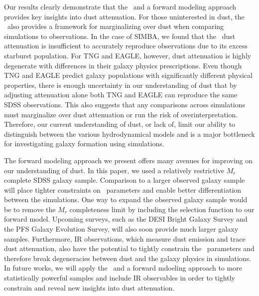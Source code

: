 Our results clearly demonstrate that the \eda~and a forward modeling approach
provides key insights into dust attenuation. For those uninterested in dust,
the \eda~also provides a framework for marginalizing over dust when comparing
simulations to observations. In the case of SIMBA, we found that the \eda~dust
attenuation is insufficient to accurately reproduce observations due to its 
excess starburst population. For TNG and EAGLE, however, dust attenuation is highly
degenerate with differences in their galaxy physics
prescriptions. Even though TNG and EAGLE predict galaxy populations with
significantly different physical properties, there is enough uncertainty in our
understanding of dust that by adjusting attenuation alone both TNG and EAGLE
can reproduce the same SDSS observations. This also suggests that any
comparisons across simulations must marginalize over dust attenuation or run 
the risk of overinterpretation. Therefore, our current understanding of dust,
or lack of, limit
our ability to distinguish between the various hydrodynamical models and is a
major bottleneck for investigating galaxy formation using simulations.

The forward modeling approach we present offers many avenues for improving on
our understanding of dust. In this paper, we used a relatively restrictive 
$M_r$ complete SDSS galaxy sample. Comparison to a larger observed galaxy
sample will place tighter constraints on \eda~parameters and enable better
differentiation between the simulations. One way to expand the observed galaxy
sample would be to remove the $M_r$ completeness limit by including the
selection function to our forward model. Upcoming surveys, such as the DESI
Bright Galaxy Survey and the PFS Galaxy Evolution Survey, will also soon
provide much larger galaxy samples. Furthermore, IR observations, which measure
dust emission and trace dust attenuation, also have the potential to tightly 
constrain the \eda~parameters and therefore break degeneracies between dust
and the galaxy physics in simulations. In future works, we will apply the
\eda~and a forward mdoeling approach to more statistically powerful samples and
include IR observables in order to tightly constrain and reveal new insights 
into dust attenuation. 
